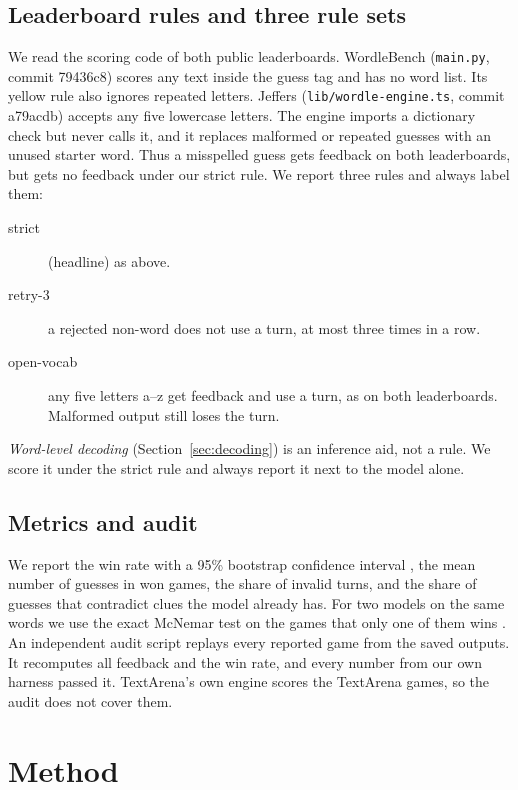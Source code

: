 \documentclass{article}
\begin{document}
\subsection{Leaderboard rules and three rule sets}
\label{sec:rules}
We read the scoring code of both public leaderboards.
WordleBench (\texttt{main.py}, commit 79436c8) scores any text inside the guess tag and has no word list.
Its yellow rule also ignores repeated letters.
Jeffers (\texttt{lib/wordle-engine.ts}, commit a79acdb) accepts any five lowercase letters.
The engine imports a dictionary check but never calls it, and it replaces malformed or repeated guesses with an unused starter word.
Thus a misspelled guess gets feedback on both leaderboards, but gets no feedback under our strict rule.
We report three rules and always label them:
\begin{description}
\item[strict] (headline) as above.
\item[retry-3] a rejected non-word does not use a turn, at most three times in a row.
\item[open-vocab] any five letters a--z get feedback and use a turn, as on both leaderboards. Malformed output still loses the turn.
\end{description}
\emph{Word-level decoding} (Section~\ref{sec:decoding}) is an inference aid, not a rule.
We score it under the strict rule and always report it next to the model alone.

\subsection{Metrics and audit}
We report the win rate with a 95\% bootstrap confidence interval \citep{efron1979bootstrap}, the mean number of guesses in won games, the share of invalid turns, and the share of guesses that contradict clues the model already has.
For two models on the same words we use the exact McNemar test on the games that only one of them wins \citep{mcnemar1947}.
An independent audit script replays every reported game from the saved outputs.
It recomputes all feedback and the win rate, and every number from our own harness passed it.
TextArena's own engine scores the TextArena games, so the audit does not cover them.

\section{Method}
\label{sec:method}
\end{document}
